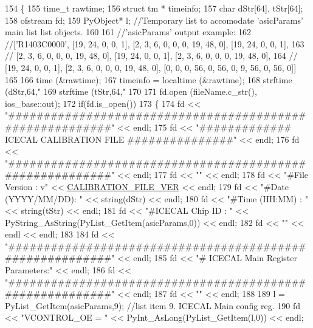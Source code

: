 \begin{DoxyCode}
154 \{
155   time\_t rawtime;
156   \textcolor{keyword}{struct }tm * timeinfo;
157     \textcolor{keywordtype}{char} dStr[64], tStr[64];
158     ofstream fd;
159     PyObject* l;        \textcolor{comment}{//Temporary list to accomodate 'asicParams' main list list objects.}
160 
161     \textcolor{comment}{//'asicParams' output example:}
162     \textcolor{comment}{//['R1403C0000', [19, 24, 0, 0, 1], [2, 3, 6, 0, 0, 0, 19, 48, 0], [19, 24, 0, 0, 1],}
163     \textcolor{comment}{// [2, 3, 6, 0, 0, 0, 19, 48, 0], [19, 24, 0, 0, 1], [2, 3, 6, 0, 0, 0, 19, 48, 0], }
164     \textcolor{comment}{// [19, 24, 0, 0, 1], [2, 3, 6, 0, 0, 0, 19, 48, 0], [0, 0, 0, 56, 0, 56, 0, 9, 56, 0, 56, 0]]}
165 
166   time (&rawtime);
167   timeinfo = localtime (&rawtime);
168     strftime (dStr,64,\textcolor{stringliteral}{"%
169     strftime (tStr,64,\textcolor{stringliteral}{"%
170 
171     fd.open (fileName.c\_str(), ios\_base::out);
172     \textcolor{keywordflow}{if}(fd.is\_open())
173     \{
174         fd << \textcolor{stringliteral}{"#########################################################"} << endl;
175         fd << \textcolor{stringliteral}{"#############   ICECAL CALIBRATION FILE   ###############"} << endl;
176         fd << \textcolor{stringliteral}{"#########################################################"} << endl;
177         fd << \textcolor{stringliteral}{""} << endl;
178         fd << \textcolor{stringliteral}{"#File Version     : v"} << \hyperlink{ICECALv3_8h_ab10444bd2aa43310cf654abe4e4a7af6}{CALIBRATION\_FILE\_VER} << endl;
179         fd << \textcolor{stringliteral}{"#Date (YYYY/MM/DD): "} << string(dStr) << endl;
180         fd << \textcolor{stringliteral}{"#Time (HH:MM)     : "} << string(tStr) << endl;
181         fd << \textcolor{stringliteral}{"#ICECAL Chip ID   : "} << PyString\_AsString(PyList\_GetItem(asicParams,0)) << endl;
182         fd << \textcolor{stringliteral}{""} << endl << endl;
183     
184         fd << \textcolor{stringliteral}{"#########################################################"} << endl;
185         fd << \textcolor{stringliteral}{"# ICECAL Main Register Parameters:"} << endl;
186         fd << \textcolor{stringliteral}{"#########################################################"} << endl;
187         fd << \textcolor{stringliteral}{""} << endl;
188 
189         l = PyList\_GetItem(asicParams,9);       \textcolor{comment}{//list item 9. ICECAL Main config reg.}
190         fd <<   \textcolor{stringliteral}{"VCONTROL\_OE = "} << PyInt\_AsLong(PyList\_GetItem(l,0)) << endl;
}}
\end{DoxyCode}
